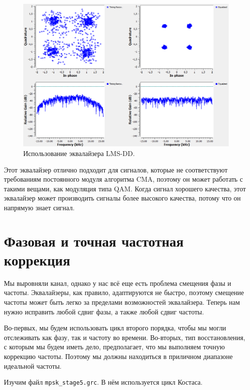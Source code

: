 \documentclass[a4paper, 14pt]{extarticle}
\begin{document}
    \begin{figure}[H]
        \centering
        \includegraphics[width=0.7\linewidth]{resources/Images/task5_using_lms_dd}
        \caption{Использование эквалайзера LMS-DD.}
        \label{fig:task5_using_lms_dd}
    \end{figure}

    Этот эквалайзер отлично подходит для сигналов, которые не соответствуют требованиям постоянного модуля
    алгоритма CMA, поэтому он может работать с такими вещами, как модуляция типа QAM.
    Когда сигнал хорошего качества, этот эквалайзер может производить сигналы более высокого качества,
    потому что он напрямую знает сигнал.

    \newpage

    \section{Фазовая и точная частотная коррекция}
    \label{sec:task6}

    Мы выровняли канал, однако у нас всё еще есть проблема смещения фазы и частоты.
    Эквалайзеры, как правило, адаптируются не быстро, поэтому смещение частоты может быть легко за
    пределами возможностей эквалайзера.
    Теперь нам нужно исправить любой сдвиг фазы, а также любой сдвиг частоты.

    Во-первых, мы будем использовать цикл второго порядка, чтобы мы могли отслеживать как фазу,
    так и частоту во времени.
    Во-вторых, тип восстановления, с которым мы будем иметь дело, предполагает, что мы выполняем точную
    коррекцию частоты.
    Поэтому мы должны находиться в приличном диапазоне идеальной частоты.

    Изучим файл \texttt{mpsk\_stage5.grc}. В нём используется цикл Костаса.
\end{document}
